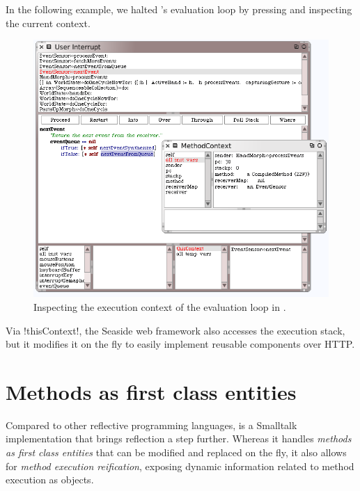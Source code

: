 \documentclass[a4paper,10pt,twoside]{book}
\begin{document}
In the following example, we halted \squeak's evaluation loop by pressing  and inspecting the current context.

\begin{figure}[ht]\centering
	\includegraphics[width=\linewidth]{MethodContext}
	\caption{Inspecting the execution context of the evaluation loop in \squeak.\label{fig:MethodContext}}
\end{figure}

Via \ct!thisContext!, the Seaside web framework also accesses the execution stack, but it modifies it on the fly to easily implement reusable components over HTTP.


\section{Methods as first class entities}

Compared to other reflective programming languages, \squeak is a Smalltalk implementation that brings reflection a step further. Whereas it handles \emph{methods as first class entities} that can be modified and replaced on the fly, it also allows for \emph{method execution reification}, exposing dynamic information related to method execution as objects.


\end{document}
